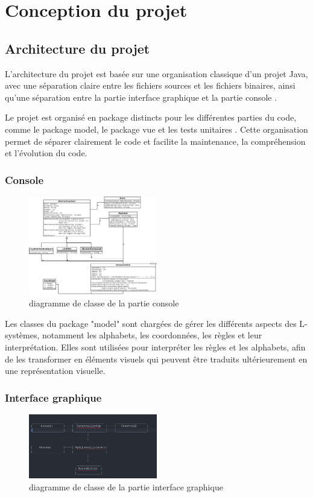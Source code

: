 \section {Conception du projet}

\subsection{Architecture du projet}

\label{arch}L'architecture du projet est basée sur une organisation classique d'un projet Java, avec une séparation claire entre les fichiers sources et les fichiers binaires, ainsi qu'une séparation entre la partie interface graphique et la partie console .


	Le projet est organisé en package distincts pour les différentes parties du code, comme le package model, le package vue et les tests unitaires . Cette organisation permet de séparer clairement le code et facilite la maintenance, la compréhension et l'évolution du code.
	\subsubsection{Console } 	
	\begin{figure}[h!]
  \centering
  \includegraphics[width=0.5\textwidth]{images/diagramme_console.png}
  \caption{diagramme de classe de la partie console}
  \label{fig:console}
\end{figure}

		Les classes du package "model" sont chargées de gérer les différents aspects des L-systèmes, notamment les alphabets, les coordonnées, les règles et leur interprétation. Elles sont utilisées pour interpréter les règles et les alphabets, afin de les transformer en éléments visuels qui peuvent être traduits ultérieurement en une représentation visuelle.

\subsubsection{Interface graphique}
	\begin{figure}[h!]
  \centering
  \includegraphics[width=0.5\textwidth]{images/diagramme_interface.png}
  \caption{diagramme de classe de la partie interface graphique}
  \label{fig:interface}
\end{figure}	
	
